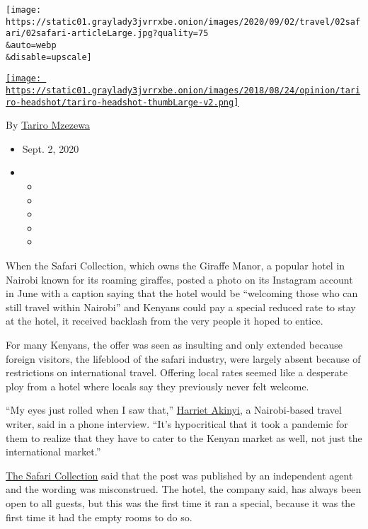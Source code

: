 \texttt{[image: https://static01.graylady3jvrrxbe.onion/images/2020/09/02/travel/02safari/02safari-articleLarge.jpg?quality=75\\\&auto=webp\\\&disable=upscale]}

\href{https://www.nytimes3xbfgragh.onion/by/tariro-mzezewa}{\texttt{[image: https://static01.graylady3jvrrxbe.onion/images/2018/08/24/opinion/tariro-headshot/tariro-headshot-thumbLarge-v2.png]}}

By \href{https://www.nytimes3xbfgragh.onion/by/tariro-mzezewa}{Tariro
Mzezewa}

\begin{itemize}
\item
  Sept. 2, 2020
\item
  \begin{itemize}
  \item
  \item
  \item
  \item
  \item
  \end{itemize}
\end{itemize}

When the Safari Collection, which owns the Giraffe Manor, a popular
hotel in Nairobi known for its roaming giraffes, posted a photo on its
Instagram account in June with a caption saying that the hotel would be
``welcoming those who can still travel within Nairobi'' and Kenyans
could pay a special reduced rate to stay at the hotel, it received
backlash from the very people it hoped to entice.

For many Kenyans, the offer was seen as insulting and only extended
because foreign visitors, the lifeblood of the safari industry, were
largely absent because of restrictions on international travel. Offering
local rates seemed like a desperate ploy from a hotel where locals say
they previously never felt welcome.

``My eyes just rolled when I saw that,''
\href{https://www.instagram.com/harrietowalla/}{Harriet Akinyi}, a
Nairobi-based travel writer, said in a phone interview. ``It's
hypocritical that it took a pandemic for them to realize that they have
to cater to the Kenyan market as well, not just the international
market.''

\href{https://www.thesafaricollection.com/properties/giraffe-manor/}{The
Safari Collection} said that the post was published by an independent
agent and the wording was misconstrued. The hotel, the company said, has
always been open to all guests, but this was the first time it ran a
special, because it was the first time it had the empty rooms to do so.

